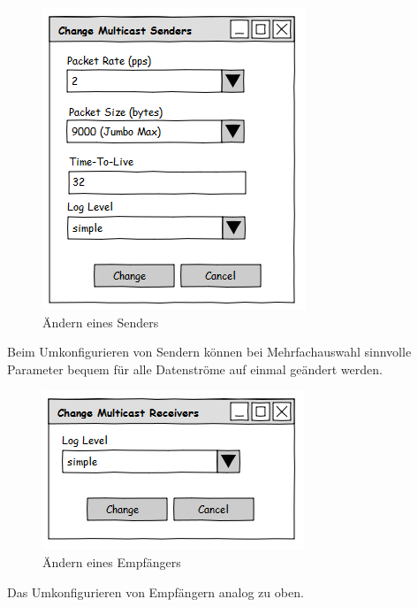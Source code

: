 \begin{figure}[H]
\centering
\includegraphics[scale=0.5]{images/gui/changesender.png}
\caption{Ändern eines Senders}
\end{figure}
Beim Umkonfigurieren von Sendern können bei Mehrfachauswahl sinnvolle Parameter
bequem für alle Datenströme auf einmal geändert werden.

\begin{figure}[H]
\centering
\includegraphics[scale=0.5]{images/gui/changerec.png}
\caption{Ändern eines Empfängers}
\end{figure}
Das Umkonfigurieren von Empfängern analog zu oben.

